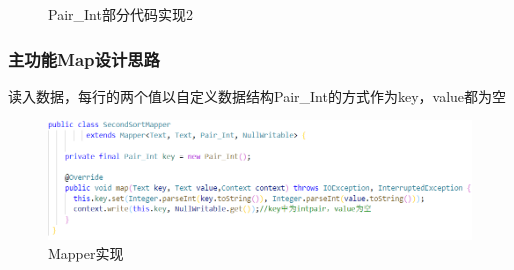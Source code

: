 \documentclass[a4paper,UTF8]{article}
\numberwithin{equation}{section}
\begin{document}
\begin{figure}[H]
    \centering
    \vfill

    \caption{Pair\_Int部分代码实现2}
\end{figure}
\subsubsection{主功能Map设计思路}
读入数据，每行的两个值以自定义数据结构Pair\_Int的方式作为key，value都为空
\begin{figure}[H]
    \centering

    \includegraphics[width = 15cm]{map1.png}

    \caption{Mapper实现}
    \label{mapper}
\end{figure}
\end{document}
